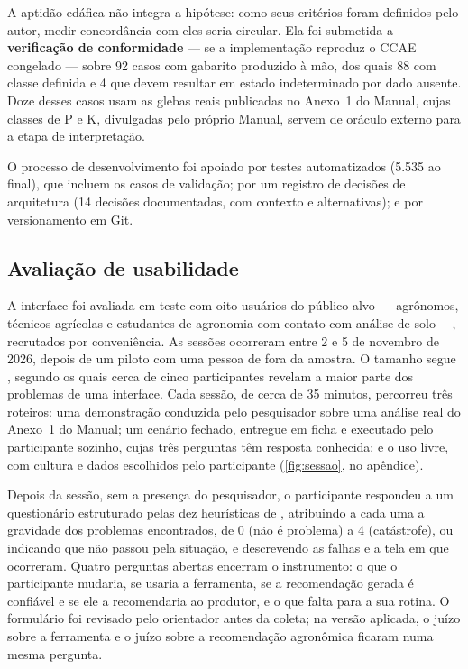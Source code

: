 A aptidão edáfica não integra a hipótese: como seus critérios foram definidos pelo autor, medir
concordância com eles seria circular. Ela foi submetida a \textbf{verificação de conformidade}
--- se a implementação reproduz o CCAE congelado --- sobre 92 casos com gabarito produzido à mão,
dos quais 88 com classe definida e 4 que devem resultar em estado indeterminado por dado
ausente. Doze desses casos usam as glebas reais publicadas no Anexo~1 do Manual, cujas classes de
P e K, divulgadas pelo próprio Manual, servem de oráculo externo para a etapa de interpretação.

O processo de desenvolvimento foi apoiado por testes automatizados (5.535 ao final), que
incluem os casos de validação; por um registro de decisões de arquitetura (14 decisões
documentadas, com contexto e alternativas); e por versionamento em Git.

\subsection{Avaliação de usabilidade}\label{sec:usabilidade}

A interface foi avaliada em teste com oito usuários do público-alvo --- agrônomos, técnicos
agrícolas e estudantes de agronomia com contato com análise de solo ---, recrutados por
conveniência. As sessões ocorreram entre 2 e 5 de novembro de 2026, depois de um piloto com uma
pessoa de fora da amostra. O tamanho segue \cite{NielsenLandauer1993}, segundo os quais cerca
de cinco participantes revelam a maior parte dos problemas de uma interface. Cada sessão, de
cerca de 35 minutos, percorreu três roteiros: uma demonstração conduzida pelo pesquisador sobre
uma análise real do Anexo~1 do Manual; um cenário fechado, entregue em ficha e executado pelo
participante sozinho, cujas três perguntas têm resposta conhecida; e o uso livre, com cultura e
dados escolhidos pelo participante (\autoref{fig:sessao}, no apêndice).

Depois da sessão, sem a presença do pesquisador, o participante respondeu a um questionário
estruturado pelas dez heurísticas de \cite{Nielsen1994}, atribuindo a cada uma a gravidade dos
problemas encontrados, de 0 (não é problema) a 4 (catástrofe), ou indicando que não passou pela
situação, e descrevendo as falhas e a tela em que ocorreram. Quatro perguntas abertas encerram
o instrumento: o que o participante mudaria, se usaria a ferramenta, se a recomendação gerada é
confiável e se ele a recomendaria ao produtor, e o que falta para a sua rotina. O formulário foi
revisado pelo orientador antes da coleta; na versão aplicada, o juízo sobre a ferramenta e o
juízo sobre a recomendação agronômica ficaram numa mesma pergunta.

